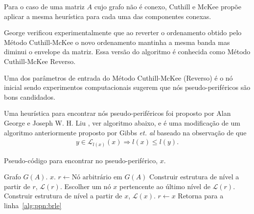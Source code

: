 Para o caso de uma matriz $A$ cujo grafo não é conexo, Cuthill e McKee propõe
aplicar a mesma heurística para cada uma das componentes conexas.

George \cite{George:1971:ComputerImplementation} verificou
experimentalmente que ao reverter o ordenamento obtido pelo Método
Cuthill-McKee o novo ordenamento mantinha a mesma banda mas diminui o
envelope da matriz. Essa versão do algoritmo é conhecida como Método Cuthill-McKee
Reverso.

Uma dos parâmetros de entrada do Método Cuthill-McKee (Reverso) é o nó inicial sendo
experimentos computacionais \cite{Cuthill:1969:ReducingBandwidth} sugerem que
nós pseudo-periféricos são bons candidados.

Uma heurística para encontrar nós pseudo-periféricos foi proposto por Alan
George e Joseph W. H. Liu \cite{George:1979:NodeFinder}, ver algoritmo
abaixo, e é uma
modificação de um algoritmo anteriormente proposto por Gibbs \textit{et. al}
\cite{Gibbs:1976:ReducingBandwidth} baseado na observação de que
\begin{align*}
    y \in \mathcal{L}_{l(x)}(x) \Longrightarrow l(x) \leq l(y).
\end{align*}
\begin{algorithm}[H]
    \caption{Pseudo-código para encontrar no pseudo-periférico, $x$.}
    \label{alg:ppn}
    \begin{algorithmic}[1]
        \REQUIRE Grafo $G(A)$.
        \ENSURE $x$.
        \STATE $r \longleftarrow \text{Nó arbitrário em }G(A)$
        \STATE Construir estrutura de nível a partir de $r$, $\mathcal{L}(r)$.
        \label{alg:ppn:brle}
        \STATE Escolher um nó $x$ pertencente ao último nível de
        $\mathcal{L}(r)$.
        \STATE Construir estrutura de nível a partir de $x$, $\mathcal{L}(x)$.
            \STATE $r \longleftarrow x$
            \STATE Retorna para a linha~\ref{alg:ppn:brle}
        \ENDIF
    \end{algorithmic}
\end{algorithm}
